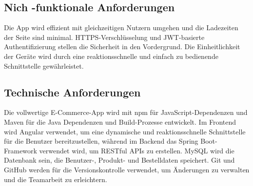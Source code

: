\subsection{Nich -funktionale Anforderungen}

Die App wird effizient mit gleichzeitigen Nutzern umgehen und die Ladezeiten der Seite sind minimal. HTTPS-Verschlüsselung und JWT-basierte Authentifizierung stellen die Sicherheit in den Vordergrund. Die Einheitlichkeit der Geräte wird durch eine reaktionsschnelle und einfach zu bedienende Schnittstelle gewährleistet.

\subsection{Technische  Anforderungen}

Die vollwertige E-Commerce-App wird mit npm für JavaScript-Dependenzen und Maven für die Java Dependenzen und Build-Prozesse entwickelt. Im Frontend wird Angular verwendet, um eine dynamische und reaktionsschnelle Schnittstelle für die Benutzer bereitzustellen, während im Backend das Spring Boot-Framework verwendet wird, um RESTful APIs zu erstellen. MySQL wird die Datenbank sein, die Benutzer-, Produkt- und Bestelldaten speichert. Git und GitHub werden für die Versionskontrolle verwendet, um Änderungen zu verwalten und die Teamarbeit zu erleichtern. 